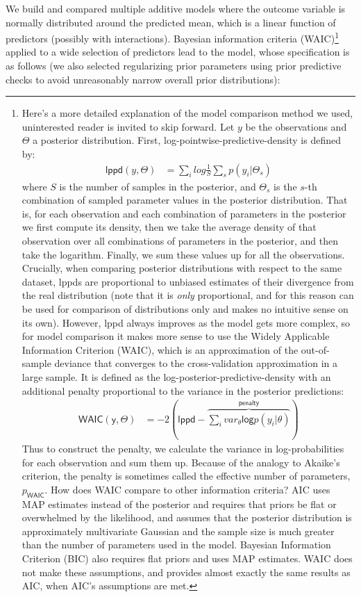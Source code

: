 \documentclass[
  10pt,
  dvipsnames, enabledeprecatedfontcommands]{scrartcl}
\begin{document}
We build and compared multiple additive models where the outcome
variable is normally distributed around the predicted mean, which is a
linear function of predictors (possibly with interactions). Bayesian
information criteria (WAIC)\footnote{
Here's a more detailed explanation of the model comparison method we used, uninterested reader is invited to skip forward. Let  $y$ be the observations and $\Theta$  a posterior distribution.
First, log-pointwise-predictive-density is defined by:
\begin{align*}
\mathsf{lppd}(y, \Theta) & = \sum_i log\frac{1}{S}\sum_s p (y_i\vert \Theta_s)
\end{align*}
\noindent where $S$ is the number of samples in the posterior, and $\Theta_s$ 
is the $s$-th combination of sampled parameter values in the posterior distribution. That is, 
for each observation and each combination of 
parameters in the posterior we first compute its density, then 
we take the average density of that observation over all combinations of parameters in the posterior,
and  then take the logarithm. Finally, we sum these values up for all the observations. Crucially, when comparing posterior distributions with respect to the same dataset, \textsf{lppd}s are proportional
 to unbiased estimates of their divergence from the real distribution (note that it is \emph{only} 
 proportional, and for this reason can be used for comparison of distributions 
 only and makes no intuitive sense on its own).  However, \textsf{lppd} always improves
  as the model gets more complex, so for model comparison it makes more sense to use 
 the Widely Applicable Information Criterion (WAIC), which is an approximation of the out-of-sample deviance that converges to the cross-validation approximation in a large sample. It  is defined as
 the log-posterior-predictive-density with an additional
  penalty proportional to the variance in the
  posterior predictions:
  \begin{align*}
\mathsf{WAIC(y, \Theta)} & = -2 (\mathsf{lppd} - \overbrace{\sum_i var_\theta \mathsf{log} p (y_i \vert \theta)}^{\mathsf{penalty}})
  \end{align*}
\noindent  Thus to construct the penalty, we calculate the variance in log-probabilities for each observation and sum them up. Because of the analogy to Akaike's criterion, the penalty is sometimes called the effective number of parameters, $p_{\mathsf{WAIC}}$. 
How does WAIC compare to other information criteria?  AIC uses MAP estimates instead of the posterior and requires that priors be flat or overwhelmed by the likelihood, and assumes that the posterior distribution is approximately multivariate Gaussian and the sample size is  much greater  than the number of parameters used in the model. Bayesian Information Criterion (BIC) also requires flat priors and uses MAP estimates. WAIC does not make these assumptions, and provides almost exactly the same results as AIC, when AIC’s assumptions are met.}
applied to a wide selection of predictors lead to the model, whose
specification is as follows (we also selected regularizing prior
parameters using prior predictive checks to avoid unreasonably narrow
overall prior distributions):
\end{document}
